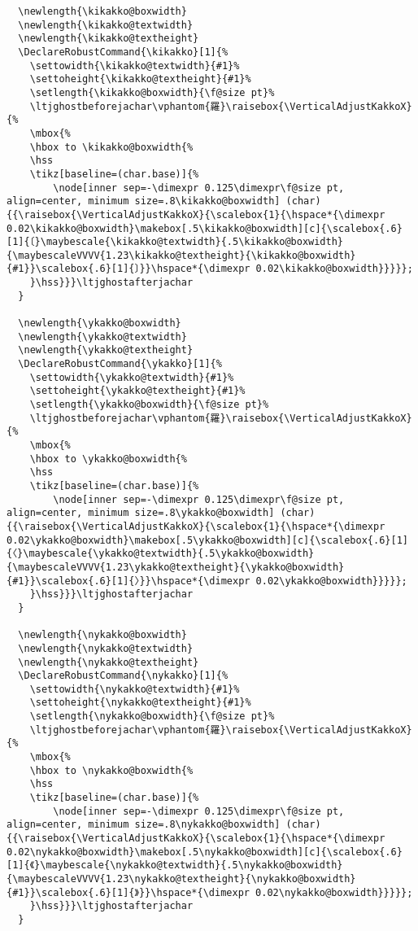 \documentclass[luatex,fontsize=10pt,paper=b5,twoside]{jlreq}%
\begin{document}
\begin{lstlisting}
  \newlength{\kikakko@boxwidth}
  \newlength{\kikakko@textwidth}
  \newlength{\kikakko@textheight}
  \DeclareRobustCommand{\kikakko}[1]{%
    \settowidth{\kikakko@textwidth}{#1}%
    \settoheight{\kikakko@textheight}{#1}%
    \setlength{\kikakko@boxwidth}{\f@size pt}%
    \ltjghostbeforejachar\vphantom{羅}\raisebox{\VerticalAdjustKakkoX}{%
    \mbox{%
    \hbox to \kikakko@boxwidth{%
    \hss
    \tikz[baseline=(char.base)]{%
        \node[inner sep=-\dimexpr 0.125\dimexpr\f@size pt, align=center, minimum size=.8\kikakko@boxwidth] (char) {{\raisebox{\VerticalAdjustKakkoX}{\scalebox{1}{\hspace*{\dimexpr 0.02\kikakko@boxwidth}\makebox[.5\kikakko@boxwidth][c]{\scalebox{.6}[1]{〔}\maybescale{\kikakko@textwidth}{.5\kikakko@boxwidth}{\maybescaleVVVV{1.23\kikakko@textheight}{\kikakko@boxwidth}{#1}}\scalebox{.6}[1]{〕}}\hspace*{\dimexpr 0.02\kikakko@boxwidth}}}}};
    }\hss}}}\ltjghostafterjachar
  }

  \newlength{\ykakko@boxwidth}
  \newlength{\ykakko@textwidth}
  \newlength{\ykakko@textheight}
  \DeclareRobustCommand{\ykakko}[1]{%
    \settowidth{\ykakko@textwidth}{#1}%
    \settoheight{\ykakko@textheight}{#1}%
    \setlength{\ykakko@boxwidth}{\f@size pt}%
    \ltjghostbeforejachar\vphantom{羅}\raisebox{\VerticalAdjustKakkoX}{%
    \mbox{%
    \hbox to \ykakko@boxwidth{%
    \hss
    \tikz[baseline=(char.base)]{%
        \node[inner sep=-\dimexpr 0.125\dimexpr\f@size pt, align=center, minimum size=.8\ykakko@boxwidth] (char) {{\raisebox{\VerticalAdjustKakkoX}{\scalebox{1}{\hspace*{\dimexpr 0.02\ykakko@boxwidth}\makebox[.5\ykakko@boxwidth][c]{\scalebox{.6}[1]{〈}\maybescale{\ykakko@textwidth}{.5\ykakko@boxwidth}{\maybescaleVVVV{1.23\ykakko@textheight}{\ykakko@boxwidth}{#1}}\scalebox{.6}[1]{〉}}\hspace*{\dimexpr 0.02\ykakko@boxwidth}}}}};
    }\hss}}}\ltjghostafterjachar
  }

  \newlength{\nykakko@boxwidth}
  \newlength{\nykakko@textwidth}
  \newlength{\nykakko@textheight}
  \DeclareRobustCommand{\nykakko}[1]{%
    \settowidth{\nykakko@textwidth}{#1}%
    \settoheight{\nykakko@textheight}{#1}%
    \setlength{\nykakko@boxwidth}{\f@size pt}%
    \ltjghostbeforejachar\vphantom{羅}\raisebox{\VerticalAdjustKakkoX}{%
    \mbox{%
    \hbox to \nykakko@boxwidth{%
    \hss
    \tikz[baseline=(char.base)]{%
        \node[inner sep=-\dimexpr 0.125\dimexpr\f@size pt, align=center, minimum size=.8\nykakko@boxwidth] (char) {{\raisebox{\VerticalAdjustKakkoX}{\scalebox{1}{\hspace*{\dimexpr 0.02\nykakko@boxwidth}\makebox[.5\nykakko@boxwidth][c]{\scalebox{.6}[1]{《}\maybescale{\nykakko@textwidth}{.5\nykakko@boxwidth}{\maybescaleVVVV{1.23\nykakko@textheight}{\nykakko@boxwidth}{#1}}\scalebox{.6}[1]{》}}\hspace*{\dimexpr 0.02\nykakko@boxwidth}}}}};
    }\hss}}}\ltjghostafterjachar
  }


\end{lstlisting}
\end{document}
